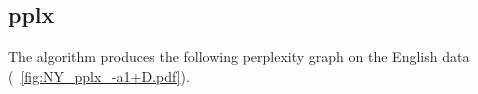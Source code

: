 \documentclass[a4paper,10pt,twoside]{report}
\begin{document}

\subsection{pplx}

The \igtree{} algorithm produces the following perplexity graph on the
English data (\figurename~\ref{fig:NY_pplx_-a1+D.pdf}).
\end{document}
